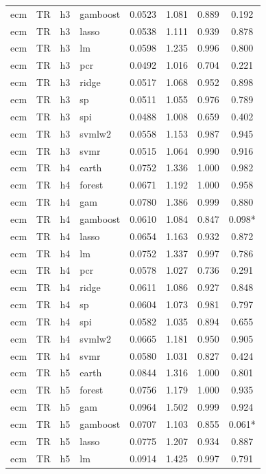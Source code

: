 \begin{ThreePartTable}
\begin{longtable}[t]{llclcccc}
ecm & TR & h3 & gamboost & 0.0523 & 1.081 & 0.889 & 0.192\\
ecm & TR & h3 & lasso & 0.0538 & 1.111 & 0.939 & 0.878\\
ecm & TR & h3 & lm & 0.0598 & 1.235 & 0.996 & 0.800\\
ecm & TR & h3 & pcr & 0.0492 & 1.016 & 0.704 & 0.221\\
ecm & TR & h3 & ridge & 0.0517 & 1.068 & 0.952 & 0.898\\
ecm & TR & h3 & sp & 0.0511 & 1.055 & 0.976 & 0.789\\
ecm & TR & h3 & spi & 0.0488 & 1.008 & 0.659 & 0.402\\
ecm & TR & h3 & svmlw2 & 0.0558 & 1.153 & 0.987 & 0.945\\
ecm & TR & h3 & svmr & 0.0515 & 1.064 & 0.990 & 0.916\\
\addlinespace
ecm & TR & h4 & earth & 0.0752 & 1.336 & 1.000 & 0.982\\
ecm & TR & h4 & forest & 0.0671 & 1.192 & 1.000 & 0.958\\
ecm & TR & h4 & gam & 0.0780 & 1.386 & 0.999 & 0.880\\
ecm & TR & h4 & gamboost & 0.0610 & 1.084 & 0.847 & 0.098*\\
ecm & TR & h4 & lasso & 0.0654 & 1.163 & 0.932 & 0.872\\
ecm & TR & h4 & lm & 0.0752 & 1.337 & 0.997 & 0.786\\
ecm & TR & h4 & pcr & 0.0578 & 1.027 & 0.736 & 0.291\\
ecm & TR & h4 & ridge & 0.0611 & 1.086 & 0.927 & 0.848\\
ecm & TR & h4 & sp & 0.0604 & 1.073 & 0.981 & 0.797\\
ecm & TR & h4 & spi & 0.0582 & 1.035 & 0.894 & 0.655\\
ecm & TR & h4 & svmlw2 & 0.0665 & 1.181 & 0.950 & 0.905\\
ecm & TR & h4 & svmr & 0.0580 & 1.031 & 0.827 & 0.424\\
\addlinespace
ecm & TR & h5 & earth & 0.0844 & 1.316 & 1.000 & 0.801\\
ecm & TR & h5 & forest & 0.0756 & 1.179 & 1.000 & 0.935\\
ecm & TR & h5 & gam & 0.0964 & 1.502 & 0.999 & 0.924\\
ecm & TR & h5 & gamboost & 0.0707 & 1.103 & 0.855 & 0.061*\\
ecm & TR & h5 & lasso & 0.0775 & 1.207 & 0.934 & 0.887\\
ecm & TR & h5 & lm & 0.0914 & 1.425 & 0.997 & 0.791\\

\end{longtable}
\end{ThreePartTable}

